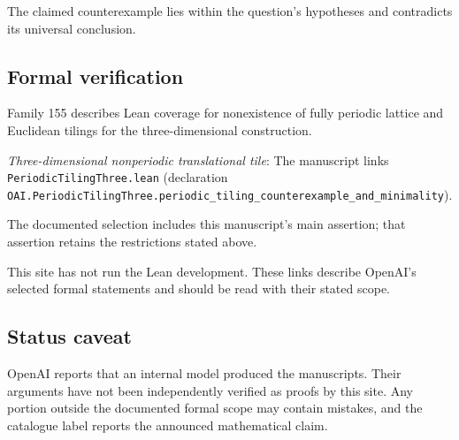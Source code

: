 \documentclass[11pt]{article}
\begin{document}
The claimed counterexample lies within the question’s hypotheses and contradicts its universal conclusion.

\subsection{Formal verification}
Family 155 describes Lean coverage for nonexistence of fully periodic lattice and Euclidean tilings for the three-dimensional construction.

\textit{Three-dimensional nonperiodic translational tile}: The manuscript links \texttt{PeriodicTilingThree.lean} (declaration \texttt{OAI.PeriodicTilingThree.periodic\_tiling\_counterexample\_and\_minimality}).

The documented selection includes this manuscript’s main assertion; that assertion retains the restrictions stated above.

This site has not run the Lean development. These links describe OpenAI’s selected formal statements and should be read with their stated scope.

\subsection{Status caveat}
OpenAI reports that an internal model produced the manuscripts. Their arguments have not been independently verified as proofs by this site. Any portion outside the documented formal scope may contain mistakes, and the catalogue label reports the announced mathematical claim.
\end{document}
